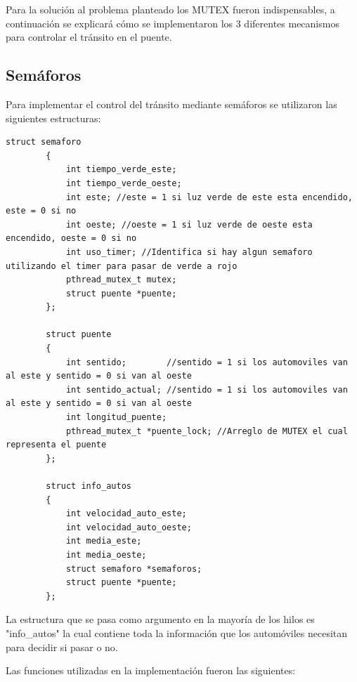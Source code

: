 \documentclass[16pt,a4papper]{article}
\begin{document}
	Para la solución al problema planteado los MUTEX fueron indispensables, a continuación se explicará cómo se implementaron los 3 diferentes mecanismos para controlar el tránsito en el puente.
	
	\subsection{Semáforos}
	Para implementar el control del tránsito mediante semáforos se utilizaron las siguientes estructuras:
	
	\begin{lstlisting}[style=CStyle]
		struct semaforo
		{
			int tiempo_verde_este;
			int tiempo_verde_oeste;
			int este; //este = 1 si luz verde de este esta encendido, este = 0 si no 
			int oeste; //oeste = 1 si luz verde de oeste esta encendido, oeste = 0 si no
			int uso_timer; //Identifica si hay algun semaforo utilizando el timer para pasar de verde a rojo
			pthread_mutex_t mutex; 
			struct puente *puente; 
		};
		
		struct puente
		{
			int sentido;        //sentido = 1 si los automoviles van al este y sentido = 0 si van al oeste
			int sentido_actual; //sentido = 1 si los automoviles van al este y sentido = 0 si van al oeste
			int longitud_puente;
			pthread_mutex_t *puente_lock; //Arreglo de MUTEX el cual representa el puente
		};
		
		struct info_autos 
		{
			int velocidad_auto_este;
			int velocidad_auto_oeste;
			int media_este;
			int media_oeste;
			struct semaforo *semaforos;
			struct puente *puente;
		};
	\end{lstlisting}
	
	La estructura que se pasa como argumento en la mayoría de los hilos es "info\_autos" la cual contiene toda la información que los automóviles necesitan para decidir si pasar o no.
	
	Las funciones utilizadas en la implementación fueron las siguientes:
	
\end{document}
